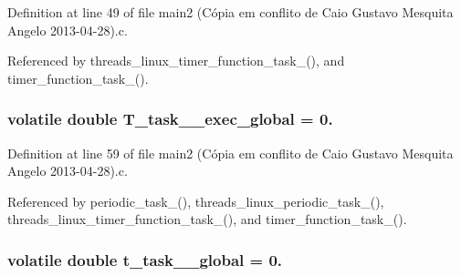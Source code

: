 Definition at line 49 of file main2 (\-Cópia em conflito de Caio Gustavo Mesquita Angelo 2013-\/04-\/28).\-c.



Referenced by threads\-\_\-linux\-\_\-timer\-\_\-function\-\_\-task\-\_(), and timer\-\_\-function\-\_\-task\-\_().

\hypertarget{main2_01_07C_xC3_xB3pia_01em_01conflito_01de_01Caio_01Gustavo_01Mesquita_01Angelo_012013-04-28_08_8c_a9629c77cd3dba9d47d15c2e51bdde09d}{
\subsubsection[{T\-\_\-task\-\_\-2\-\_\-exec\-\_\-global}]{\setlength{\rightskip}{0pt plus 5cm}volatile double T\-\_\-task\-\_\-\_\-exec\-\_\-global = 0.}}\label{main2_01_07C_xC3_xB3pia_01em_01conflito_01de_01Caio_01Gustavo_01Mesquita_01Angelo_012013-04-28_08_8c_a9629c77cd3dba9d47d15c2e51bdde09d}


Definition at line 59 of file main2 (\-Cópia em conflito de Caio Gustavo Mesquita Angelo 2013-\/04-\/28).\-c.



Referenced by periodic\-\_\-task\-\_(), threads\-\_\-linux\-\_\-periodic\-\_\-task\-\_(), threads\-\_\-linux\-\_\-timer\-\_\-function\-\_\-task\-\_(), and timer\-\_\-function\-\_\-task\-\_().

\hypertarget{main2_01_07C_xC3_xB3pia_01em_01conflito_01de_01Caio_01Gustavo_01Mesquita_01Angelo_012013-04-28_08_8c_a08f794ff34d918d3d34d771e11e4aba3}{
\subsubsection[{t\-\_\-task\-\_\-2\-\_\-global}]{\setlength{\rightskip}{0pt plus 5cm}volatile double t\-\_\-task\-\_\-\_\-global = 0.}}\label{main2_01_07C_xC3_xB3pia_01em_01conflito_01de_01Caio_01Gustavo_01Mesquita_01Angelo_012013-04-28_08_8c_a08f794ff34d918d3d34d771e11e4aba3}


